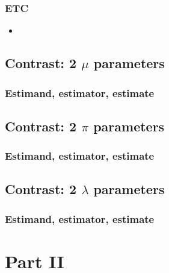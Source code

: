 \documentclass[]{book}
\begin{document}
\hypertarget{etc-3}{%
\section{ETC}\label{etc-3}}

\begin{itemize}
\item
\end{itemize}

\hypertarget{contrast2Muparas}{%
\chapter{\texorpdfstring{Contrast: 2 \(\mu\) parameters}{Contrast: 2 \textbackslash{}mu parameters}}\label{contrast2Muparas}}

\hypertarget{estimand-estimator-estimate-3}{%
\section{Estimand, estimator, estimate}\label{estimand-estimator-estimate-3}}

\hypertarget{contrast2Piparas}{%
\chapter{\texorpdfstring{Contrast: 2 \(\pi\) parameters}{Contrast: 2 \textbackslash{}pi parameters}}\label{contrast2Piparas}}

\hypertarget{estimand-estimator-estimate-4}{%
\section{Estimand, estimator, estimate}\label{estimand-estimator-estimate-4}}

\hypertarget{contrast2Lambdaparas}{%
\chapter{\texorpdfstring{Contrast: 2 \(\lambda\) parameters}{Contrast: 2 \textbackslash{}lambda parameters}}\label{contrast2Lambdaparas}}

\hypertarget{estimand-estimator-estimate-5}{%
\section{Estimand, estimator, estimate}\label{estimand-estimator-estimate-5}}

\hypertarget{part-part-ii-1}{%
\part{Part II}\label{part-part-ii-1}}
\end{document}
